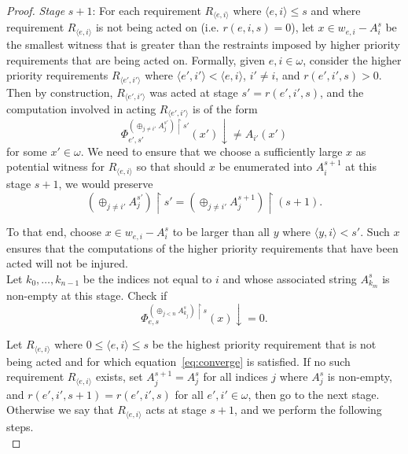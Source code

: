\documentclass{article}
\begin{document}
\begin{enumerate}[label={(\roman*)}]
\begin{proof}
        \textit{Stage} $s+1$: For each requirement $R_{\langle e,i\rangle}$
        where $\langle e,i\rangle \leq s$ and where requirement $R_{\langle
        e,i\rangle}$ is not being acted on (i.e. $r(e,i,s)=0$), let $x\in
        w_{e,i}-A_i^s$ be the smallest witness that is greater than the
        restraints imposed by higher priority requirements that are
        being acted on. Formally, given $e,i\in\omega$, consider the higher
        priority requirements $R_{\langle e',i'\rangle}$ where
        $\langle e',i'\rangle <\langle e,i\rangle$, $i'\neq i$, and
        $r(e',i',s)>0$. Then by construction, $R_{\langle e',i'\rangle}$
        was acted at stage $s'=r(e',i',s)$, and the computation
        involved in acting $R_{\langle e',i'\rangle}$ is of the form
        \[\Phi_{e',s'}^{(\oplus_{j\neq i'} A_{j}^{s'}) \restriction s'}
        (x')\downarrow\neq A_{i'}(x')\]
        for some $x'\in\omega$. We need to ensure that we choose a
        sufficiently large $x$ as potential witness for $R_{\langle
        e,i\rangle}$ so that should $x$ be enumerated into $A_i^{s+1}$ at
        this stage $s+1$, we would preserve
        \[(\oplus_{j\neq i'} A_{j}^{s'}) \restriction s' =(\oplus_{j\neq
        i'} A_{j}^{s+1}) \restriction (s+1).\]

        To that end, choose $x\in w_{e,i}-A_i^s$ to be larger than all $y$
        where $\langle y,i\rangle <s'$. Such $x$ ensures that the
        computations of the higher priority requirements that have been
        acted will not be injured. \\

        Let $k_0,\ldots,k_{n-1}$ be the indices not equal to $i$ and whose
        associated string $A_{k_m}^s$ is non-empty at this stage. Check if
        \begin{equation}
          \Phi_{e,s}^{(\oplus_{j<n} A_{k_j}^s) \restriction s}(x)
          \downarrow=0.
          \label{eq:converge}
        \end{equation}

        Let $R_{\langle e,i\rangle}$ where $0\leq \langle e,i\rangle \leq
        s$ be the highest priority requirement that is not being acted and
        for which equation~\eqref{eq:converge} is satisfied. If no such
        requirement $R_{\langle e,i\rangle}$ exists, set
        $A_j^{s+1}=A_j^s$ for all indices $j$ where $A_j^s$ is non-empty,
        and $r(e',i',s+1)=r(e',i',s)$ for all $e',i'\in\omega$,
        then go to the next stage. Otherwise we say that $R_{\langle
        e,i\rangle}$ acts at stage $s+1$, and we perform the following
        steps. \\


\end{proof}
\end{enumerate}
\end{document}
